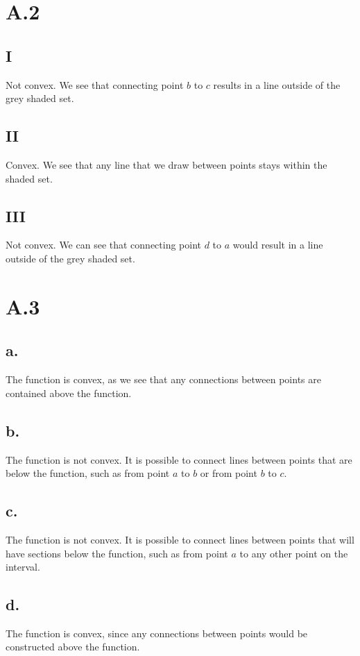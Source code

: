 \documentclass{article}
\newcommand{\1}{\mathbf{1}}
\begin{document}
\section*{A.2}
{\Large 

\subsection*{I}
Not convex. We see that connecting point $b$ to $c$ results in a line outside of the grey shaded set.

\subsection*{II}
Convex. We see that any line that we draw between points stays within the shaded set.

\subsection*{III}
Not convex. We can see that connecting point $d$ to $a$ would result in a line outside of the grey shaded set.

}

\section*{A.3}
{\Large 

\subsection*{a.}

The function is convex, as we see that any connections between points are contained above the function.

\subsection*{b.}

The function is not convex. It is possible to connect lines between points that are below the function, such as from point $a$ to $b$ or from point $b$ to $c$.

\subsection*{c.}

The function is not convex. It is possible to connect lines between points that will have sections below the function, such as from point $a$ to any other point on the interval.

\subsection*{d.}

The function is convex, since any connections between points would be constructed above the function.

}
\end{document}
